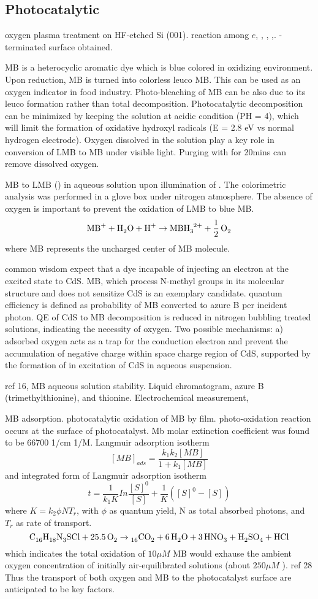 \documentclass[11pt]{article} %
\begin{document}
\subsection{Photocatalytic}

oxygen plasma treatment on HF-etched Si (001). reaction among $e$, , , ,. -terminated surface obtained.\cite{Habib2010}


MB is a heterocyclic aromatic dye which is blue colored in oxidizing environment. Upon reduction, MB is turned into colorless leuco MB. This can be used as an oxygen indicator in food industry. Photo-bleaching of MB can be also due to its leuco formation rather than total decomposition. Photocatalytic decomposition can be minimized by keeping the solution at acidic condition (PH = 4), which will limit the formation of oxidative hydroxyl radicals (E = 2.8 eV vs normal hydrogen electrode). Oxygen dissolved in the solution play a key role in conversion of LMB to MB under visible light. Purging with  for 20mins can remove dissolved oxygen.\cite{Wang2014a}

\cite{Yoneyama1972} MB to LMB () in aqueous solution upon illumination of . The colorimetric analysis was performed in a glove box under nitrogen atmosphere. The absence of oxygen is important to prevent the oxidation of LMB to blue MB.
\[
\cee{MB^+ + H2O + H^+ \rightarrow MBH3^{2+} + 1/2O2}
\]
where MB represents the uncharged center of MB molecule.

\cite{Takizawa1978} common wisdom expect that a dye incapable of injecting an electron at the excited state to CdS. MB, which process N-methyl groups in its molecular structure and does not sensitize CdS is an exemplary candidate. quantum efficiency is defined as probability of MB converted to azure B per incident photon. QE of CdS to MB decomposition is reduced in nitrogen bubbling treated solutions, indicating the necessity of oxygen. Two possible mechanisms: a) adsorbed oxygen acts as a trap for the conduction electron and prevent the accumulation of negative charge within space charge region of CdS, supported by the formation of  in excitation of CdS in aqueous suspension.

ref 16, MB aqueous solution stability. Liquid chromatogram, azure B (trimethylthionine), and thionine. Electrochemical measurement,

\cite{Matthews1989} MB adsorption.  photocatalytic oxidation of MB by  film. photo-oxidation reaction occurs at the surface of photocatalyst. Mb molar extinction coefficient was found to be 66700 1/cm 1/M. Langmuir adsorption isotherm
\[
[MB]_{ads} = \frac{k_1 k_2 [MB]}{1 + k_1[MB]}
\]
and integrated form of Langmuir adsorption isotherm
\[
t = \frac{1}{k_1K} In\frac{[S]^0}{[S]} + \frac{1}{K}([S]^0 - [S])
\]
where $K = k_2 \phi N T_r$, with $\phi$ as quantum yield, N as total absorbed photons, and $T_r$ as rate of transport.
\[
\cee{C16H18N3SCl + 25.5O2 \rightarrow 16CO2 + 6H2O + 3HNO3 + H2SO4 +HCl}
\]
which indicates the total oxidation of $10 \mu M$ MB would exhause the ambient oxygen concentration of initially air-equilibrated solutions (about $250 \mu M$ ). ref 28 Thus the transport of both oxygen and MB to the photocatalyst surface are anticipated to be key factors.
\end{document}
